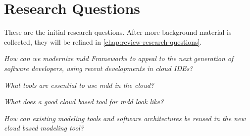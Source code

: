 \section{Research Questions}

These are the initial research questions. After more background material is collected, they will be refined in \cref{chap:review-research-questions}.

\begin{questions}[leftmargin=1cm]
  \item \emph{How can we modernize \acrlong{mdd} Frameworks to appeal to the next generation of software developers, using recent developments in \gls{cloud} \acrshort{IDE}s?}\label{rq:1}
  \begin{questions}  
    \item \emph{What tools are essential to use \acrlong{mdd} in the \gls{cloud}?}\label{rq:2}
    \item \emph{What does a good \gls{cloud} based tool for \acrlong{mdd} look like?}\label{rq:3}
    \item \emph{How can existing modeling tools and software architectures be reused in the new \gls{cloud} based modeling tool?}\label{rq:4}
  \end{questions}
\end{questions}

